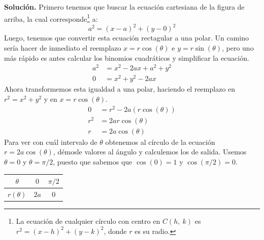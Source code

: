 \documentclass[12pt]{article}
\begin{document}
\begin{figure}[hbt!]
\centering


\end{figure}

\textbf{Solución.} Primero tenemos que buscar la ecuación cartesiana de la figura de arriba, la cual corresponde\footnote{La ecuación de cualquier círculo con centro en $C(h, \ k)$ es $r^{2} = (x - h)^{2} + (y - k)^{2}$, donde $r$ es su radio.} a:
\[
  a^{2} = (x - a)^{2} + (y - 0)^{2}
\]
Luego, tenemos que convertir esta ecuación rectagular a una polar. Un camino sería hacer de inmediato el reemplazo $x = r \cos(\theta)$ e $y = r \sin(\theta)$, pero uno más rápido es antes calcular los binomios cuadráticos y simplificar la ecuación.
\begin{align*}
  a^{2} &= x^{2} - 2ax + a^{2} + y^{2} \\
  0 &= x^{2} + y^{2} - 2ax
\end{align*}
Ahora transformemos esta igualdad a una polar, haciendo el reemplazo en $r^{2} = x^{2} + y^{2}$ y en $x = r \cos(\theta)$.
\begin{align*}
  0 &= r^{2} - 2a(r \cos(\theta)) \\
  r^{2} &= 2a r \cos(\theta) \\
  r &= 2a \cos(\theta)
\end{align*}
Para ver con cuál intervalo de $\theta$ obtenemos al círculo de la ecuación $r = 2a \cos(\theta)$, démosle valores al ángulo y calculemos los de salida. Usemos $\theta = 0$ y $\theta = \pi/2$, puesto que sabemos que $\cos(0) = 1$ y $\cos(\pi/2) = 0$.

\begin{table}[hbt!]
\centering

\begin{tabular}{c|c c}
$\theta$ & $0$ & $\pi / 2$ \\
\hline
$r(\theta)$ & $2a$ & $0$
\end{tabular}

\end{table}
\end{document}
